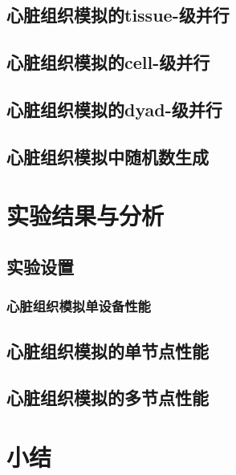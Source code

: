  \subsection{心脏组织模拟的tissue-级并行}
 
 \subsection{心脏组织模拟的cell-级并行}

\subsection{心脏组织模拟的dyad-级并行}

\subsection{心脏组织模拟中随机数生成}



\section{实验结果与分析}
\subsection{实验设置}

\subsubsection{心脏组织模拟单设备性能}

\subsection{心脏组织模拟的单节点性能}

\subsection{心脏组织模拟的多节点性能}

\section{小结}
